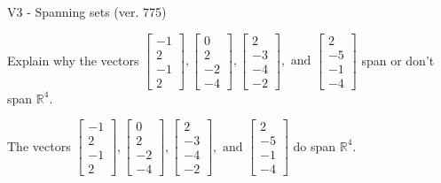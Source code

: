 \begin{exercise}
  \begin{exerciseTitle}V3 - Spanning sets (ver. 775)\end{exerciseTitle}
  \begin{exerciseStatement}
    Explain why the vectors \(\left[\begin{array}{r}
-1 \\
2 \\
-1 \\
2
\end{array}\right] , \left[\begin{array}{r}
0 \\
2 \\
-2 \\
-4
\end{array}\right] , \left[\begin{array}{r}
2 \\
-3 \\
-4 \\
-2
\end{array}\right] , \text{ and } \left[\begin{array}{r}
2 \\
-5 \\
-1 \\
-4
\end{array}\right]\) span or don't span \(\mathbb{R}^4\). 
	


  \end{exerciseStatement}
  \begin{exerciseAnswer}
   The vectors \(\left[\begin{array}{r}
-1 \\
2 \\
-1 \\
2
\end{array}\right] , \left[\begin{array}{r}
0 \\
2 \\
-2 \\
-4
\end{array}\right] , \left[\begin{array}{r}
2 \\
-3 \\
-4 \\
-2
\end{array}\right] , \text{ and } \left[\begin{array}{r}
2 \\
-5 \\
-1 \\
-4
\end{array}\right]\) 
  	 do  
	span \(\mathbb{R}^4\).
  


  \end{exerciseAnswer}
\end{exercise}